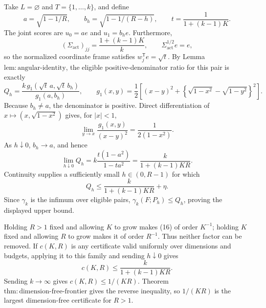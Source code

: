 Take \(L=\varnothing\) and \(T=\{1,\ldots,k\}\), and define
\[
 a=\sqrt{1-1/R},\qquad
 b_h=\sqrt{1-1/(R-h)},\qquad
 t=\frac1{1+(k-1)K}.
\]
The joint scores are \(u_0=ae\) and \(u_1=b_he\). Furthermore,
\[
 (\Sigma_{\mathrm{act}})_{jj}=\frac{1+(k-1)K}{k},
 \qquad \Sigma_{\mathrm{act}}^{1/2}e=e,
\]
so the normalized coordinate frame satisfies \(w_j^{\mathsf T}e=\sqrt t\). By Lemma \(\mathrm{lem{:}angular\text{-}identity}\), the eligible positive-denominator ratio for this pair is exactly
\[
 Q_h=\frac{k\,g_1(\sqrt t\,a,\sqrt t\,b_h)}{g_1(a,b_h)},
 \qquad
 g_1(x,y)=\frac12\left[(x-y)^2+\left\{\sqrt{1-x^2}-\sqrt{1-y^2}\right\}^2\right]. \tag{15}
\]
Because \(b_h\ne a\), the denominator is positive. Direct differentiation of \(x\mapsto(x,\sqrt{1-x^2})\) gives, for \(|x|<1\),
\[
 \lim_{y\to x}\frac{g_1(x,y)}{(x-y)^2}=\frac1{2(1-x^2)}.
\]
As \(h\downarrow0\), \(b_h\to a\), and hence
\[
 \lim_{h\downarrow0}Q_h
 =k\frac{t(1-a^2)}{1-ta^2}
 =\frac{k}{1+(k-1)KR}. \tag{16}
\]
Continuity supplies a sufficiently small \(h\in(0,R-1)\) for which
\[
 Q_h\le\frac{k}{1+(k-1)KR}+\eta.
\]
Since \(\gamma_k\) is the infimum over eligible pairs, \(\gamma_k(F;P_h)\le Q_h\), proving the displayed upper bound.

Holding \(R>1\) fixed and allowing \(K\) to grow makes (16) of order \(K^{-1}\); holding \(K\) fixed and allowing \(R\) to grow makes it of order \(R^{-1}\). Thus neither factor can be removed. If \(c(K,R)\) is any certificate valid uniformly over dimensions and budgets, applying it to this family and sending \(h\downarrow0\) gives
\[
 c(K,R)\le\frac{k}{1+(k-1)KR}.
\]
Sending \(k\to\infty\) gives \(c(K,R)\le1/(KR)\). Theorem \(\mathrm{thm{:}dimension\text{-}free\text{-}frontier}\) gives the reverse inequality, so \(1/(KR)\) is the largest dimension-free certificate for \(R>1\).
